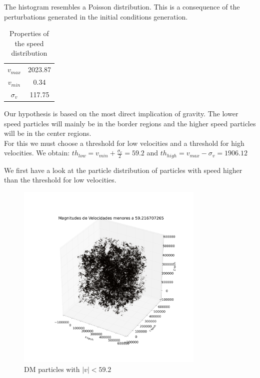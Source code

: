 \documentclass[12pt]{article}
\begin{document}
The histogram resembles a Poisson distribution. This is a consequence of the perturbations generated in the initial conditions generation. 

\begin{table}[ht]
    \centering
    \begin{tabular}{|c|c|}
        $v_{max}$ & 2023.87 \\
        $v_{min}$ & 0.34\\
        $\sigma_{v}$ & 117.75 
    \end{tabular}
    \caption{Properties of the speed distribution}
    \label{tab:vel}
\end{table}
\FloatBarrier

Our hypothesis is based on the most direct implication of gravity. The lower speed
particles will mainly be in the border regions and the higher speed particles
will be in the center regions. \\

For this we must choose a threshold for low velocities and a threshold for high velocities. 
We obtain: $th_{low} = v_{min} + \frac{\sigma_{v}}{2} = 59.2$ and $th_{high} = v_{max}  - \sigma_{v} = 1906.12 $

We first have a look at the particle distribution of particles with speed higher than the
threshold for low velocities.\\
\begin{figure}[ht]
\begin{center}
\includegraphics[width=0.8\textwidth]{graphs/pos_3d_vel_menor_s_smaller.png} %
\caption{DM particles with $|v| < 59.2 $}
\label{fg:3d_thresh_low}
\end{center}
\end{figure}
\FloatBarrier
\end{document}
